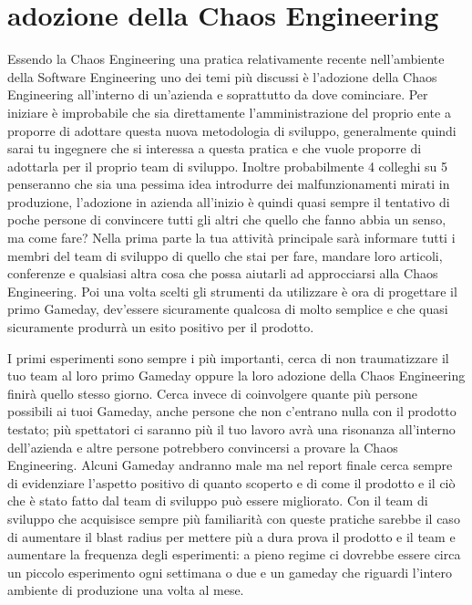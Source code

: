 \section{adozione della Chaos Engineering}
Essendo la Chaos Engineering una pratica relativamente recente nell'ambiente della Software Engineering uno dei temi più discussi è l'adozione della Chaos Engineering all'interno di un'azienda e soprattutto da dove cominciare.
Per iniziare è improbabile che sia direttamente l'amministrazione del proprio ente a proporre di adottare questa nuova metodologia di sviluppo, generalmente quindi sarai tu ingegnere che si interessa a questa pratica e che vuole proporre di adottarla per il proprio team di sviluppo.
Inoltre probabilmente 4 colleghi su 5 penseranno che sia una pessima idea introdurre dei malfunzionamenti mirati in produzione, l'adozione in azienda all'inizio è quindi quasi sempre il tentativo di poche persone di convincere tutti gli altri che quello che fanno abbia un senso, ma come fare?
Nella prima parte la tua attività principale sarà informare tutti i membri del team di sviluppo di quello che stai per fare, mandare loro articoli, conferenze e qualsiasi altra cosa che possa aiutarli ad approcciarsi alla Chaos Engineering.
Poi una volta scelti gli strumenti da utilizzare è ora di progettare il primo Gameday, dev'essere sicuramente qualcosa di molto semplice e che quasi sicuramente produrrà un esito positivo per il prodotto.

I primi esperimenti sono sempre i più importanti, cerca di non traumatizzare il tuo team al loro primo Gameday oppure la loro adozione della Chaos Engineering finirà quello stesso giorno.
Cerca invece di coinvolgere quante più persone possibili ai tuoi Gameday, anche persone che non c'entrano nulla con il prodotto testato; più spettatori ci saranno più il tuo lavoro avrà una risonanza all'interno dell'azienda e altre persone potrebbero convincersi a provare la Chaos Engineering.
Alcuni Gameday andranno male ma nel report finale cerca sempre di evidenziare l'aspetto positivo di quanto scoperto e di come il prodotto e il ciò che è stato fatto dal team di sviluppo può essere migliorato.
Con il team di sviluppo che acquisisce sempre più familiarità con queste pratiche sarebbe il caso di aumentare il blast radius per mettere più a dura prova il prodotto e il team e aumentare la frequenza degli esperimenti: a pieno regime ci dovrebbe essere circa un piccolo esperimento ogni settimana o due e un gameday che riguardi l'intero ambiente di produzione una volta al mese.

